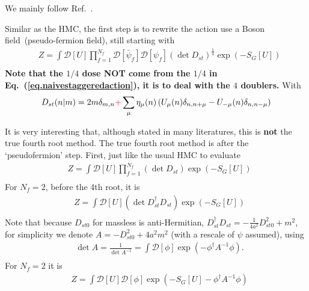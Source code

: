 We mainly follow Ref.~\cite{staggeredRHMC}.

Similar as the HMC, the first step is to rewrite the action use a Boson field~(pseudo-fermion field), still starting with
\begin{equation}
\begin{split}
&Z=\int \mathcal{D}[U] \prod _{f=1}^{N_f} \mathcal {D}[\bar{\psi}_f]\mathcal {D}[\psi _f]\left(\det D_{st}\right)^{\frac{1}{4}}\exp \left(-S_G[U]\right)\\
\end{split}
\end{equation}
\textbf{Note that the $1/4$ dose NOT come from the $1/4$ in Eq.~(\ref{eq.naivestaggeredaction}), it is to deal with the $4$ doublers.} With
\begin{equation}
\begin{split}
&D_{st}(n|m)=2m\delta _{m,n} \textcolor[rgb]{1,0,0}{+} \sum _{\mu}\eta _{\mu}(n)\left(U_{\mu}(n) \delta _{n,n+\mu} - U_{-\mu}(n)\delta _{n,n-\mu}\right)\\
\end{split}
\end{equation}

It is very interesting that, although stated in many literatures, this is \textbf{\textcolor[rgb]{1,0,0}{not}} the true fourth root method. The true fourth root method is after the `pseudofermion' step. First, just like the usual HMC to evaluate
\begin{equation}
\begin{split}
&Z=\int \mathcal{D}[U] \prod _{f=1}^{N_f} \left(\det D_{st} \right)\exp \left(-S_G[U]\right)\\
\end{split}
\end{equation}
For $N_f=2$, before the 4th root, it is
\begin{equation}
\begin{split}
&Z=\int \mathcal{D}[U] \left(\det D_{st}^{\dagger}D_{st} \right)\exp \left(-S_G[U]\right)\\
\end{split}
\end{equation}
Note that because $D_{st0}$ for massless is anti-Hermitian, $D_{st}^{\dagger}D_{st}=-\frac{1}{4a^2}D_{st0}^2+m^2$, for simplicity we denote $A=-D_{st0}^2+4a^2m^2$ (with a rescale of $\psi$ assumed), using
\begin{equation}
\begin{split}
&\det A = \frac{1}{ \det A^{-1} }=\int \mathcal{D}[\phi] \exp (-\phi^{\dagger} A^{-1} \phi).\\
\end{split}
\end{equation}
For $N_f=2$ it is
\begin{equation}
\begin{split}
&Z=\int \mathcal{D}[U]  \mathcal {D}[\phi]\exp \left(-S_G[U]-\phi ^{\dagger} A^{-1} \phi \right)
\end{split}
\end{equation}

